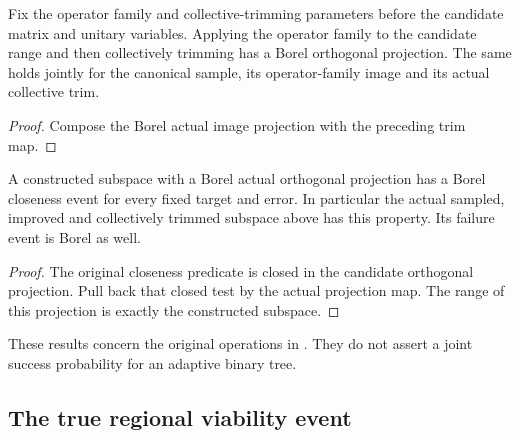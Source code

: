 \begin{lemma}
    \label{lem:borel_canonical_sample_family_trim}
    \leanok
    Fix the operator family and collective-trimming parameters before the
    candidate matrix and unitary variables. Applying the operator family
    to the candidate range and then collectively trimming has a Borel
    orthogonal projection. The same holds jointly for the canonical sample,
    its operator-family image and its actual collective trim.
\end{lemma}
\begin{proof}\leanok
    Compose the Borel actual image projection with the preceding trim map.
\end{proof}

\begin{lemma}
    \label{lem:borel_actual_sample_family_trim_closeness}
    \leanok
    A constructed subspace with a Borel actual orthogonal projection has
    a Borel closeness event for every fixed target and error. In particular
    the actual sampled, improved and collectively trimmed subspace above
    has this property. Its failure event is Borel as well.
\end{lemma}
\begin{proof}\leanok
    The original closeness predicate is closed in the candidate orthogonal
    projection. Pull back that closed test by the actual projection map.
    The range of this projection is exactly the constructed subspace.
\end{proof}

These results concern the original operations in
\cite[lines 648--655 and 1668--1670]{Arad2016RigorousRG}.
They do not assert a joint success probability for an adaptive binary tree.

\subsection{The true regional viability event}

